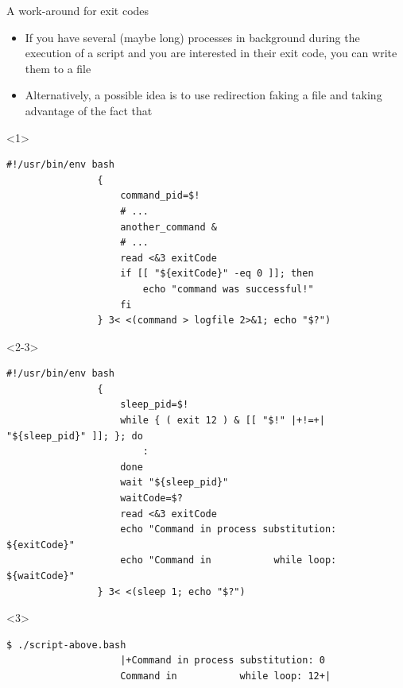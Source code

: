 \begin{frame}[fragile]{A work-around for exit codes}
    \begin{overlayarea}{\textwidth}{\textheight}
        \begin{itemize}
            \item If you have several (maybe long) processes in background during the execution of a script and you are interested in their exit code, you can write them to a file
            \item Alternatively, a possible idea is to use redirection faking a file and taking advantage of the fact that 
        \end{itemize}
        \begin{onlyenv}<1>
            \begin{lstlisting}[style=MyBash, aboveskip=3mm, emph={[7]command_pid, exitCode}, emph={[8]another_command}]
                #!/usr/bin/env bash
                {
                    command_pid=$!
                    # ...
                    another_command &
                    # ...
                    read <&3 exitCode
                    if [[ "${exitCode}" -eq 0 ]]; then
                        echo "command was successful!"
                    fi
                } 3< <(command > logfile 2>&1; echo "$?")
            \end{lstlisting}
        \end{onlyenv}
        \begin{onlyenv}<2-3>
            \begin{lstlisting}[style=MyBash, aboveskip=3mm, emph={[7]sleep_pid, exitCode, waitCode}, firstnumber=12, xrightmargin=2mm]
                #!/usr/bin/env bash
                {
                    sleep_pid=$!
                    while { ( exit 12 ) & [[ "$!" |+!=+| "${sleep_pid}" ]]; }; do
                        :
                    done
                    wait "${sleep_pid}"
                    waitCode=$?
                    read <&3 exitCode
                    echo "Command in process substitution: ${exitCode}"
                    echo "Command in           while loop: ${waitCode}"
                } 3< <(sleep 1; echo "$?")
            \end{lstlisting}
            \begin{uncoverenv}<3>
                \begin{lstlisting}[style=MyBash, numbers=none, aboveskip=1mm, xrightmargin=2mm]
                    $ ./script-above.bash
                    |+Command in process substitution: 0
                    Command in           while loop: 12+|
                \end{lstlisting}
            \end{uncoverenv}
        \end{onlyenv}
    \end{overlayarea}
\end{frame}
